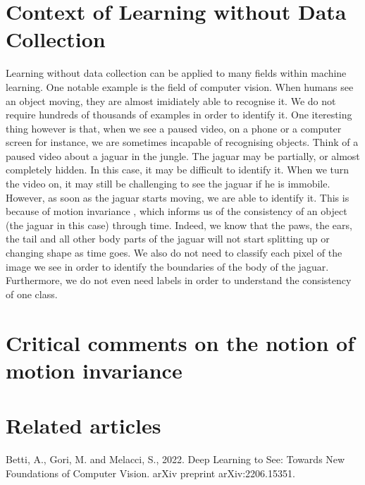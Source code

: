 \documentclass[12pt]{article}
\begin{document}
\section{Context of Learning without Data Collection}
Learning without data collection can be applied to many fields within machine learning. One notable example is the field of computer vision. When humans see an object moving, they are almost imidiately able to recognise it. We do not require hundreds of thousands of examples in order to identify it. One iteresting thing however is that, when we see a paused video, on a phone or a computer screen for instance, we are sometimes incapable of recognising objects. Think of a paused video about a jaguar in the jungle. The jaguar may be partially, or almost completely hidden. In this case, it may be difficult to identify it. When we turn the video on, it may still be challenging to see the jaguar if he is immobile. However, as soon as the jaguar starts moving, we are able to identify it. This is because of motion invariance \cite{gori2022}, which informs us of the consistency of an object (the jaguar in this case) through time. Indeed, we know that the paws, the ears, the tail and all other body parts of the jaguar will not start splitting up or changing shape as time goes. We also do not need to classify each pixel of the image we see in order to identify the boundaries of the body of the jaguar.
\\Furthermore, we do not even need labels in order to understand the consistency of one class.


\section{Critical comments on the notion of motion invariance}
\section{Related articles}

\begin{thebibliography}{99}
   Betti, A., Gori, M. and Melacci, S., 2022. Deep Learning to See: Towards New Foundations of Computer Vision. arXiv preprint arXiv:2206.15351.  
\end{thebibliography}
\end{document}
